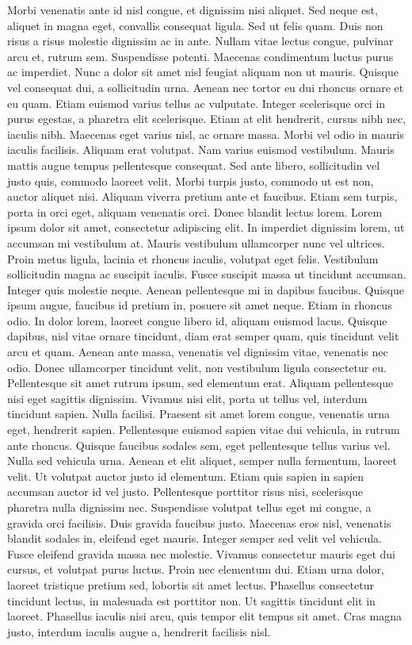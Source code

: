 \documentclass{article}
\begin{document}
Morbi venenatis ante id nisl congue, et dignissim nisi aliquet. Sed neque est, aliquet in magna eget, convallis consequat ligula. Sed ut felis quam. Duis non risus a risus molestie dignissim ac in ante. Nullam vitae lectus congue, pulvinar arcu et, rutrum sem. Suspendisse potenti. Maecenas condimentum luctus purus ac imperdiet. Nunc a dolor sit amet nisl feugiat aliquam non ut mauris. Quisque vel consequat dui, a sollicitudin urna. Aenean nec tortor eu dui rhoncus ornare et eu quam.
Etiam euismod varius tellus ac vulputate. Integer scelerisque orci in purus egestas, a pharetra elit scelerisque. Etiam at elit hendrerit, cursus nibh nec, iaculis nibh. Maecenas eget varius nisl, ac ornare massa. Morbi vel odio in mauris iaculis facilisis. Aliquam erat volutpat. Nam varius euismod vestibulum. Mauris mattis augue tempus pellentesque consequat. Sed ante libero, sollicitudin vel justo quis, commodo laoreet velit. Morbi turpis justo, commodo ut est non, auctor aliquet nisi. Aliquam viverra pretium ante et faucibus. Etiam sem turpis, porta in orci eget, aliquam venenatis orci. Donec blandit lectus lorem.
Lorem ipsum dolor sit amet, consectetur adipiscing elit. In imperdiet dignissim lorem, ut accumsan mi vestibulum at. Mauris vestibulum ullamcorper nunc vel ultrices. Proin metus ligula, lacinia et rhoncus iaculis, volutpat eget felis. Vestibulum sollicitudin magna ac suscipit iaculis. Fusce suscipit massa ut tincidunt accumsan. Integer quis molestie neque. Aenean pellentesque mi in dapibus faucibus.
Quisque ipsum augue, faucibus id pretium in, posuere sit amet neque. Etiam in rhoncus odio. In dolor lorem, laoreet congue libero id, aliquam euismod lacus. Quisque dapibus, nisl vitae ornare tincidunt, diam erat semper quam, quis tincidunt velit arcu et quam. Aenean ante massa, venenatis vel dignissim vitae, venenatis nec odio. Donec ullamcorper tincidunt velit, non vestibulum ligula consectetur eu. Pellentesque sit amet rutrum ipsum, sed elementum erat. Aliquam pellentesque nisi eget sagittis dignissim. Vivamus nisi elit, porta ut tellus vel, interdum tincidunt sapien. Nulla facilisi. Praesent sit amet lorem congue, venenatis urna eget, hendrerit sapien. Pellentesque euismod sapien vitae dui vehicula, in rutrum ante rhoncus. Quisque faucibus sodales sem, eget pellentesque tellus varius vel. Nulla sed vehicula urna. Aenean et elit aliquet, semper nulla fermentum, laoreet velit.
Ut volutpat auctor justo id elementum. Etiam quis sapien in sapien accumsan auctor id vel justo. Pellentesque porttitor risus nisi, scelerisque pharetra nulla dignissim nec. Suspendisse volutpat tellus eget mi congue, a gravida orci facilisis. Duis gravida faucibus justo. Maecenas eros nisl, venenatis blandit sodales in, eleifend eget mauris. Integer semper sed velit vel vehicula. Fusce eleifend gravida massa nec molestie. Vivamus consectetur mauris eget dui cursus, et volutpat purus luctus. Proin nec elementum dui. Etiam urna dolor, laoreet tristique pretium sed, lobortis sit amet lectus. Phasellus consectetur tincidunt lectus, in malesuada est porttitor non. Ut sagittis tincidunt elit in laoreet. Phasellus iaculis nisi arcu, quis tempor elit tempus sit amet. Cras magna justo, interdum iaculis augue a, hendrerit facilisis nisl.
\end{document}
